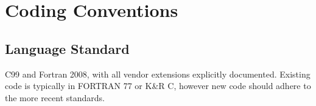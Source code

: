 

\chapter{Coding Conventions}

\section{Language Standard}

C99 and Fortran 2008, with all vendor extensions explicitly documented.
Existing code is typically in FORTRAN 77 or K\&R C, however new code should
adhere to the more recent standards.



